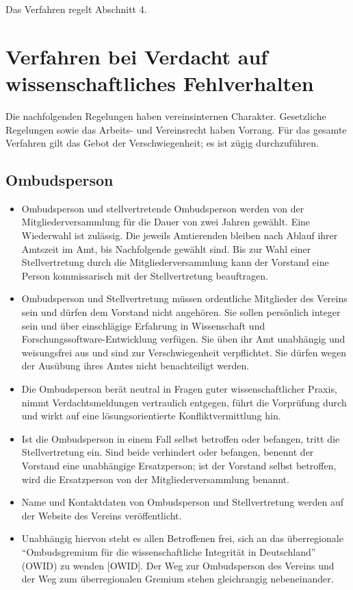 \documentclass[a4paper, fontsize=11pt]{scrartcl}
\begin{document}
Das Verfahren regelt Abschnitt 4.

\section{Verfahren bei Verdacht auf wissenschaftliches Fehlverhalten}

Die nachfolgenden Regelungen haben vereinsinternen Charakter. Gesetzliche Regelungen sowie das Arbeits- und Vereinsrecht haben Vorrang. Für das gesamte Verfahren gilt das Gebot der Verschwiegenheit; es ist zügig durchzuführen.

\subsection{Ombudsperson}
\begin{itemize}
  \item Ombudsperson und stellvertretende Ombudsperson werden von der Mitgliederversammlung für die Dauer von zwei Jahren gewählt. Eine Wiederwahl ist zulässig. Die jeweils Amtierenden bleiben nach Ablauf ihrer Amtszeit im Amt, bis Nachfolgende gewählt sind. Bis zur Wahl einer Stellvertretung durch die Mitgliederversammlung kann der Vorstand eine Person kommissarisch mit der Stellvertretung beauftragen.
  \item Ombudsperson und Stellvertretung müssen ordentliche Mitglieder des Vereins sein und dürfen dem Vorstand nicht angehören. Sie sollen persönlich integer sein und über einschlägige Erfahrung in Wissenschaft und Forschungssoftware-Entwicklung verfügen. Sie üben ihr Amt unabhängig und weisungsfrei aus und sind zur Verschwiegenheit verpflichtet. Sie dürfen wegen der Ausübung ihres Amtes nicht benachteiligt werden.
  \item Die Ombudsperson berät neutral in Fragen guter wissenschaftlicher Praxis, nimmt Verdachtsmeldungen vertraulich entgegen, führt die Vorprüfung durch und wirkt auf eine lösungsorientierte Konfliktvermittlung hin.
  \item Ist die Ombudsperson in einem Fall selbst betroffen oder befangen, tritt die Stellvertretung ein. Sind beide verhindert oder befangen, benennt der Vorstand eine unabhängige Ersatzperson; ist der Vorstand selbst betroffen, wird die Ersatzperson von der Mitgliederversammlung benannt.
  \item Name und Kontaktdaten von Ombudsperson und Stellvertretung werden auf der Website des Vereins veröffentlicht.
  \item Unabhängig hiervon steht es allen Betroffenen frei, sich an das überregionale \enquote{Ombudsgremium für die wissenschaftliche Integrität in Deutschland} (OWID) zu wenden [OWID]. Der Weg zur Ombudsperson des Vereins und der Weg zum überregionalen Gremium stehen gleichrangig nebeneinander.
\end{itemize}
\end{document}
